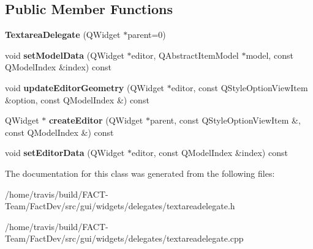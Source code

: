 \subsection*{Public Member Functions}
\begin{DoxyCompactItemize}
\item 
\hypertarget{classGui_1_1Widgets_1_1Delegates_1_1TextareaDelegate_a2dfb77334f4a12a031bed33ac5df9f5c}{{\bfseries Textarea\-Delegate} (Q\-Widget $\ast$parent=0)}\label{classGui_1_1Widgets_1_1Delegates_1_1TextareaDelegate_a2dfb77334f4a12a031bed33ac5df9f5c}

\item 
\hypertarget{classGui_1_1Widgets_1_1Delegates_1_1TextareaDelegate_a67f7736e4cc6a6f9e2841584b4f48b25}{void {\bfseries set\-Model\-Data} (Q\-Widget $\ast$editor, Q\-Abstract\-Item\-Model $\ast$model, const Q\-Model\-Index \&index) const }\label{classGui_1_1Widgets_1_1Delegates_1_1TextareaDelegate_a67f7736e4cc6a6f9e2841584b4f48b25}

\item 
\hypertarget{classGui_1_1Widgets_1_1Delegates_1_1TextareaDelegate_aca8f707d0638a3c0f1b6c200729b62c4}{void {\bfseries update\-Editor\-Geometry} (Q\-Widget $\ast$editor, const Q\-Style\-Option\-View\-Item \&option, const Q\-Model\-Index \&) const }\label{classGui_1_1Widgets_1_1Delegates_1_1TextareaDelegate_aca8f707d0638a3c0f1b6c200729b62c4}

\item 
\hypertarget{classGui_1_1Widgets_1_1Delegates_1_1TextareaDelegate_ac206e0bf0a439e5fa781282aea864cd7}{Q\-Widget $\ast$ {\bfseries create\-Editor} (Q\-Widget $\ast$parent, const Q\-Style\-Option\-View\-Item \&, const Q\-Model\-Index \&) const }\label{classGui_1_1Widgets_1_1Delegates_1_1TextareaDelegate_ac206e0bf0a439e5fa781282aea864cd7}

\item 
\hypertarget{classGui_1_1Widgets_1_1Delegates_1_1TextareaDelegate_a5db7a3dfd9c60ae3b6dda3e94f1ea16d}{void {\bfseries set\-Editor\-Data} (Q\-Widget $\ast$editor, const Q\-Model\-Index \&index) const }\label{classGui_1_1Widgets_1_1Delegates_1_1TextareaDelegate_a5db7a3dfd9c60ae3b6dda3e94f1ea16d}

\end{DoxyCompactItemize}


The documentation for this class was generated from the following files\-:\begin{DoxyCompactItemize}
\item 
/home/travis/build/\-F\-A\-C\-T-\/\-Team/\-Fact\-Dev/src/gui/widgets/delegates/textareadelegate.\-h\item 
/home/travis/build/\-F\-A\-C\-T-\/\-Team/\-Fact\-Dev/src/gui/widgets/delegates/textareadelegate.\-cpp\end{DoxyCompactItemize}
